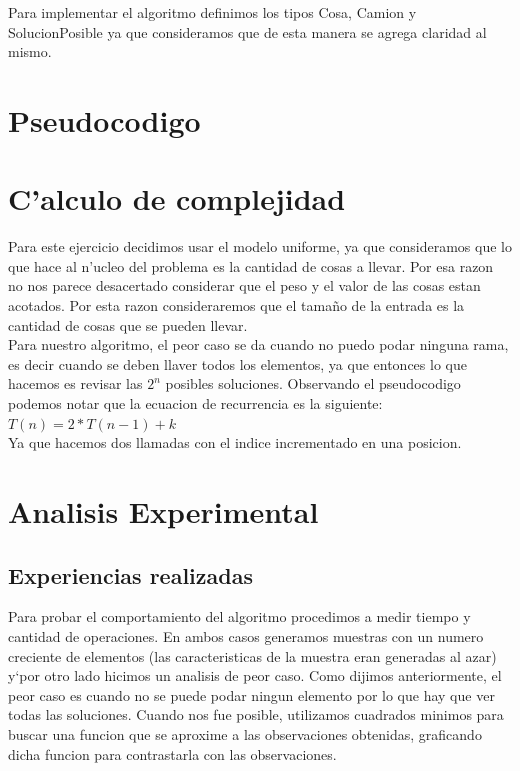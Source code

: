 Para implementar el algoritmo definimos los tipos Cosa, Camion y SolucionPosible ya que consideramos que de esta manera se 
agrega claridad al mismo.

\section{Pseudocodigo}


\section{C'alculo de complejidad}
Para este ejercicio decidimos usar el modelo uniforme, ya que consideramos que lo que hace al n'ucleo del problema es la
cantidad de cosas a llevar. Por esa razon no nos parece desacertado considerar que el peso y el valor de las cosas estan 
acotados. Por esta razon consideraremos que el tama\~{n}o de la entrada es la cantidad de cosas que se pueden llevar.\\
Para nuestro algoritmo, el peor caso se da cuando no puedo podar ninguna rama, es decir cuando se deben llaver todos los elementos, ya que entonces lo que hacemos es revisar las $2^n$ posibles soluciones.
Observando el pseudocodigo podemos notar que la ecuacion de recurrencia es la siguiente:\\
	$T(n) = 2*T(n-1) + k$\\
	Ya que hacemos dos llamadas con el indice incrementado en una posicion.\\

\section{Analisis Experimental}
\subsection{Experiencias realizadas}
Para probar el comportamiento del algoritmo procedimos a medir tiempo y cantidad de operaciones. En ambos casos generamos muestras con un numero creciente de elementos (las caracteristicas de la muestra eran generadas al azar) y`por otro lado hicimos un analisis de peor caso. Como dijimos anteriormente, el peor caso es cuando no se puede podar ningun elemento por lo que hay que ver todas las soluciones.
Cuando nos fue posible, utilizamos cuadrados minimos para buscar una funcion que se aproxime a las observaciones obtenidas, graficando dicha funcion para contrastarla con las observaciones.

